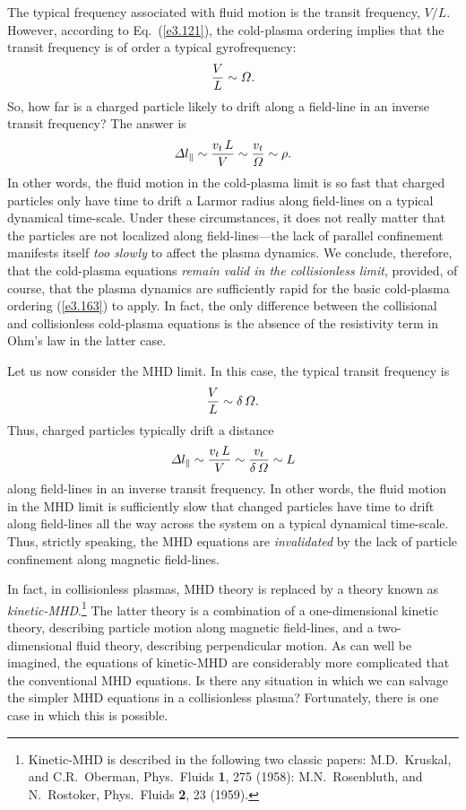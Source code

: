 The typical frequency associated with fluid motion 
is the transit frequency, $V/L$. However, according to Eq.~(\ref{e3.121}),
the cold-plasma ordering implies that the transit frequency is of order a
typical gyrofrequency:
\begin{equation}\label{e3.163}
\frac{V}{L} \sim {\mit\Omega}.
\end{equation}
So, how far is a charged particle likely to drift along a field-line in
an inverse transit frequency? The answer is
\begin{equation}
{\mit\Delta} l_\parallel \sim \frac{v_t\,L}{V} \sim \frac{v_t}{\mit\Omega}\sim  \rho.
\end{equation} 
In other words, the fluid motion  in the cold-plasma limit is so fast that
charged particles only have time to drift a Larmor radius along field-lines
on a typical dynamical time-scale. Under these circumstances, it does not
really matter that the particles are not localized along field-lines---the lack
of parallel confinement manifests itself {\em too slowly}\/ 
 to affect the plasma dynamics. We conclude, therefore, that the cold-plasma
equations {\em remain valid in the collisionless limit}, provided, of course,
 that the
plasma dynamics are sufficiently rapid for the basic cold-plasma ordering
(\ref{e3.163}) to apply. In fact, the only difference between the collisional and 
collisionless cold-plasma equations  is the absence of the resistivity term in Ohm's law in the
latter case. 

Let us now consider the MHD limit. In this case, the typical
transit frequency is
\begin{equation}\label{e3.165}
\frac{V}{L}\sim \delta\,{\mit\Omega}.
\end{equation}
Thus, charged particles typically drift a distance
\begin{equation}
{\mit\Delta} l_\parallel \sim \frac{v_t\,L}{V} \sim \frac{v_t}{\delta\,{\mit\Omega}}\sim L
\end{equation}
along field-lines in an inverse transit frequency. In other words, the
fluid motion in the MHD limit is sufficiently slow that changed particles
have time to drift along field-lines  all the way across the system 
on a
typical dynamical time-scale. Thus, strictly speaking, the MHD equations
are {\em invalidated}\/ by the lack of particle confinement along magnetic
field-lines. 

In fact, in collisionless plasmas, MHD theory is  replaced by a theory
known as {\em kinetic-MHD}.\footnote{Kinetic-MHD is described in the following
two classic papers: M.D.~Kruskal, and C.R.~Oberman, Phys.\ Fluids {\bf 1}, 275
(1958): M.N.~Rosenbluth, and N.~Rostoker, Phys.\ Fluids {\bf 2}, 23 (1959).}
 The latter theory is a combination of a
one-dimensional kinetic theory, describing particle  motion along magnetic
field-lines, and a two-dimensional fluid theory, describing perpendicular
motion. As can well be imagined, the equations of kinetic-MHD are
considerably more complicated that the conventional MHD equations. 
Is there any situation in which we can salvage the simpler MHD equations in
a collisionless plasma? Fortunately,  there
is one case in which this is possible. 

